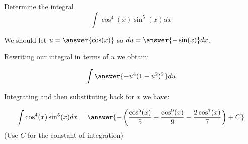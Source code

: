 \documentclass{ximera}
\author{Jason Miller}
\begin{document}
\begin{exercise}
Determine the integral
\[
\int \cos^{4}(x) \sin^{5}(x) dx
\]

We should let $u=\answer{\cos(x)}$ so $du= \answer{ -\sin(x)} dx$. 

Rewriting our integral in terms of $u$ we obtain: 

\[
\int \answer{ -u^{4} (1-u^{2})^{2} } du
\]

Integrating and then substituting back for $x$ we have:

\[
\int \cos^{4}(x) \sin^{5}(x) dx=\answer{- \left( \frac{ \cos^{5}(x)}{5} + \frac{ \cos^{9}(x)}{9} -\frac{2 \cos^{7}(x)}{7} \right)+C }
\]
(Use $C$ for the constant of integration)
\end{exercise}
\end{document}
